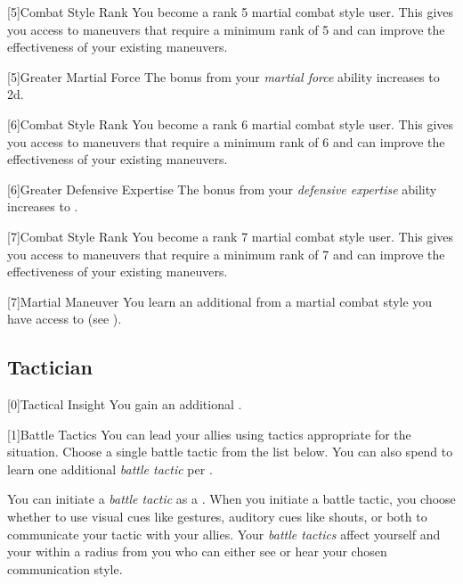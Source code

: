         {
            [5]{Combat Style Rank} You become a rank 5 martial combat style user.
            This gives you access to maneuvers that require a minimum rank of 5 and can improve the effectiveness of your existing maneuvers.

            [5]{Greater Martial Force} The bonus from your \textit{martial force} ability increases to \plus2d.
        }

        {
            [6]{Combat Style Rank} You become a rank 6 martial combat style user.
            This gives you access to maneuvers that require a minimum rank of 6 and can improve the effectiveness of your existing maneuvers.

            [6]{Greater Defensive Expertise} The bonus from your \textit{defensive expertise} ability increases to .
        }

        {
            [7]{Combat Style Rank} You become a rank 7 martial combat style user.
            This gives you access to maneuvers that require a minimum rank of 7 and can improve the effectiveness of your existing maneuvers.

            [7]{Martial Maneuver}
            You learn an additional  from a martial combat style you have access to (see ).
        }

    \newpage
    \subsection{Tactician}

        [0]{Tactical Insight} You gain an additional .

        [1]{Battle Tactics}
        You can lead your allies using tactics appropriate for the situation.
        Choose a single battle tactic from the list below.
        You can also spend  to learn one additional \textit{battle tactic} per .

        You can initiate a \textit{battle tactic} as a .
        When you initiate a battle tactic, you choose whether to use visual cues like gestures, auditory cues like shouts, or both to communicate your tactic with your allies.
        Your \textit{battle tactics} affect yourself and your  within a \areahuge radius  from you who can either see or hear your chosen communication style.

